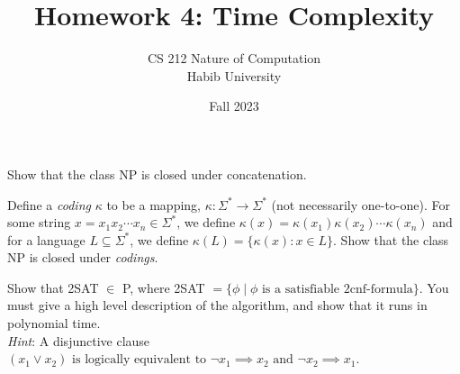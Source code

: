 \documentclass[addpoints,a4paper]{exam}
\title{Homework 4: Time Complexity}
\author{CS 212 Nature of Computation\\Habib University}
\date{Fall 2023}
\begin{document}
\maketitle

\begin{questions}
  

\question[25]


\question[25] Show that the class NP is closed under concatenation.

\question[25] Define a \textit{coding} $\kappa$ to be a mapping,  $\kappa:\Sigma^*\rightarrow \Sigma^*$ (not necessarily one-to-one). For some string $x = x_1x_2\cdots x_n\in\Sigma^*$, we define $\kappa(x) = \kappa(x_1)\kappa(x_2)\cdots\kappa(x_n)$ and for a language $L\subseteq \Sigma^*$, we define $\kappa(L) = \{\kappa(x): x\in L \}$. Show that the class NP is closed under \textit{codings}. 


\question[25] Show that 2SAT $\in$  P, where 2SAT $ = \{ \phi \mid \phi \text{ is a satisfiable 2cnf-formula}\}$. You must give a high level description of the algorithm, and show that it runs in polynomial time. \\ \textit{Hint}: A disjunctive clause $(x_1 \vee x_2) \text{ is logically equivalent to } \neg x_1 \implies x_2 \text{ and } \neg x_2 \implies x_1$.

\end{questions}
\end{document}
